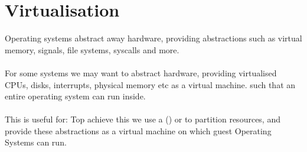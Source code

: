 \documentclass{report}
\begin{document}
\section*{Virtualisation}
Operating systems abstract away hardware, providing abstractions such as virtual memory, signals, file systems, syscalls and more.
\\
\\ For some systems we may want to abstract hardware, providing virtualised CPUs, disks, interrupts, physical memory etc as a virtual machine. such that an entire operating system can run inside.
\\
\\ This is useful for:
Top achieve this we use a  () or  to partition resources, and provide these abstractions as a virtual machine on which guest Operating Systems can run.
\end{document}
